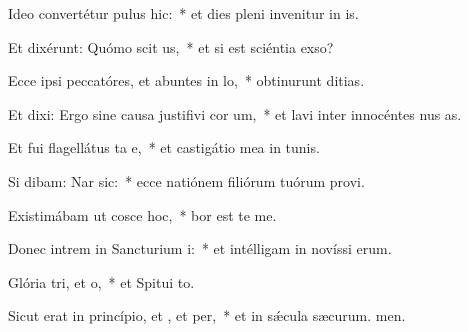 \item Ideo convertétur pulus  hic:~* et dies pleni invenitur in is.
\item Et dixérunt: Quómo scit us,~* et si est sciéntia  exso?
\item Ecce ipsi peccatóres, et abuntes in lo,~* obtinurunt ditias.
\item Et dixi: Ergo sine causa justifivi cor um,~* et lavi inter innocéntes nus as.
\item Et fui flagellátus ta e,~* et castigátio mea in tunis.
\item Si dibam: Nar sic:~* ecce natiónem filiórum tuórum provi.
\item Existimábam ut cosce hoc,~* bor est te me.
\item Donec intrem in Sancturium i:~* et intélligam in novíssi erum.
\item Glória tri, et o,~* et Spitui to.
\item Sicut erat in princípio, et , et per,~* et in sǽcula sæcurum. men.
